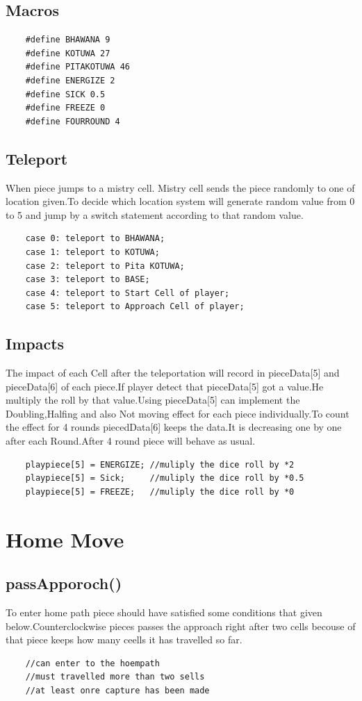 \documentclass{article}
\begin{document}
\subsection{Macros}
\begin{verbatim}
    #define BHAWANA 9
    #define KOTUWA 27
    #define PITAKOTUWA 46
    #define ENERGIZE 2
    #define SICK 0.5
    #define FREEZE 0
    #define FOURROUND 4   
\end{verbatim}

\subsection{Teleport}
When piece jumps to a mistry cell. Mistry cell sends the piece randomly to one of location given.To decide which location system will generate random value from 0 to 5 and jump by a switch statement according to that random value.


\begin{verbatim}
    case 0: teleport to BHAWANA;
    case 1: teleport to KOTUWA;
    case 2: teleport to Pita KOTUWA;
    case 3: teleport to BASE;
    case 4: teleport to Start Cell of player;
    case 5: teleport to Approach Cell of player;
\end{verbatim}

\subsection{Impacts}
The impact of each Cell after the teleportation will record in pieceData[5] and pieceData[6] of each piece.If player detect that pieceData[5] got a value.He multiply the roll by that value.Using pieceData[5] can implement the Doubling,Halfing and also Not moving effect for each piece individually.To count the effect for 4 rounds piecedData[6] keeps the data.It is decreasing one by one after each Round.After 4 round piece will behave as usual.
\begin{verbatim}
    playpiece[5] = ENERGIZE; //muliply the dice roll by *2
    playpiece[5] = Sick;     //muliply the dice roll by *0.5
    playpiece[5] = FREEZE;   //muliply the dice roll by *0
\end{verbatim}

\section{Home Move}
\subsection{passApporoch()}
To enter home path piece should have satisfied some conditions that given below.Counterclockwise pieces passes the approach right after two cells becouse of that piece keeps how many ceells it has travelled so far.
\begin{verbatim}
    //can enter to the hoempath
    //must travelled more than two sells
    //at least onre capture has been made
\end{verbatim}
\end{document}
